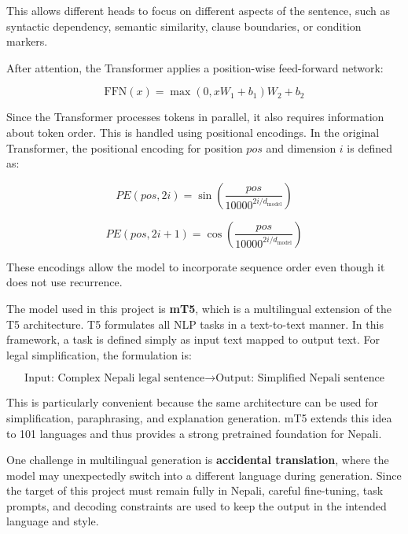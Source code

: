\documentclass[12pt]{report}
\begin{document}
This allows different heads to focus on different aspects of the sentence, such as syntactic dependency, semantic similarity, clause boundaries, or condition markers.

After attention, the Transformer applies a position-wise feed-forward network:

\begin{equation}
\text{FFN}(x) = \max(0, xW_1 + b_1)W_2 + b_2
\end{equation}

Since the Transformer processes tokens in parallel, it also requires information about token order. This is handled using positional encodings. In the original Transformer, the positional encoding for position $pos$ and dimension $i$ is defined as:

\begin{equation}
PE(pos, 2i) = \sin\left(\frac{pos}{10000^{2i/d_{\text{model}}}}\right)
\end{equation}

\begin{equation}
PE(pos, 2i+1) = \cos\left(\frac{pos}{10000^{2i/d_{\text{model}}}}\right)
\end{equation}

These encodings allow the model to incorporate sequence order even though it does not use recurrence.

The model used in this project is \textbf{mT5}, which is a multilingual extension of the T5 architecture. T5 formulates all NLP tasks in a text-to-text manner. In this framework, a task is defined simply as input text mapped to output text. For legal simplification, the formulation is:

\begin{equation}
\text{Input: Complex Nepali legal sentence} \rightarrow \text{Output: Simplified Nepali sentence}
\end{equation}

This is particularly convenient because the same architecture can be used for simplification, paraphrasing, and explanation generation. mT5 extends this idea to 101 languages and thus provides a strong pretrained foundation for Nepali.

One challenge in multilingual generation is \textbf{accidental translation}, where the model may unexpectedly switch into a different language during generation. Since the target of this project must remain fully in Nepali, careful fine-tuning, task prompts, and decoding constraints are used to keep the output in the intended language and style.
\end{document}
